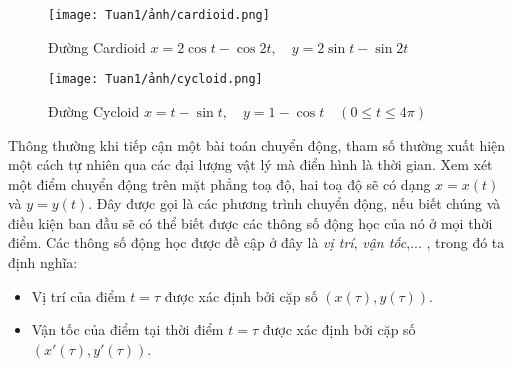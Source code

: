 \begin{figure}[H]
    \centering
    \texttt{[image: Tuan1/ảnh/cardioid.png]}
    \caption{Đường Cardioid\newline \hspace*{1em} $x = 2\cos t - \cos 2t,\quad y = 2\sin t - \sin 2t$}
\end{figure}

\begin{figure}[H]
    \centering
    \texttt{[image: Tuan1/ảnh/cycloid.png]}
    \caption{Đường Cycloid\newline \hspace*{1em} $x=t-\sin t,\quad y=1-\cos t\quad (0\leq t\leq 4\pi)$}
\end{figure}

Thông thường khi tiếp cận một bài toán chuyển động, tham số thường xuất hiện một cách tự nhiên qua các đại lượng vật lý mà điển hình là thời gian.\newline
Xem xét một điểm chuyển động trên mặt phẳng toạ độ,  hai toạ độ sẽ có dạng $x=x(t)$ và $y=y(t)$. Đây được gọi là các phương trình chuyển động, nếu biết chúng và điều kiện ban đầu sẽ có thể biết được các thông số động học của nó ở mọi thời điểm. Các thông số động học được đề cập ở đây là \emph{vị trí}, \emph{vận tốc},... , trong đó ta định nghĩa:
\begin{itemize}
    \item Vị trí của điểm $t=\tau$ được xác định bởi cặp số $(x(\tau),y(\tau))$.
    \item Vận tốc của điểm tại thời điểm $t=\tau$ được xác định bởi cặp số $(x'(\tau),y'(\tau))$.
\end{itemize}